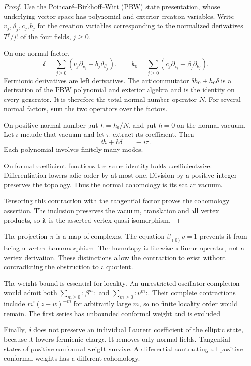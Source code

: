 \begin{proof}
Use the Poincar\'e--Birkhoff--Witt (PBW) state presentation, whose
underlying vector space has polynomial and exterior creation variables.
Write $v_j,\beta_j,c_j,b_j$ for the creation variables corresponding
to the normalized derivatives $T^j/j!$ of the four fields, $j\geq0$.

On one normal factor,
\[
 \delta=\sum_{j\geq0}
       (v_j\partial_{c_j}-b_j\partial_{\beta_j}),\qquad
 h_0=\sum_{j\geq0}
       (c_j\partial_{v_j}-\beta_j\partial_{b_j}).
\]
Fermionic derivatives are left derivatives. The anticommutator
$\delta h_0+h_0\delta$ is a derivation of the PBW polynomial and
exterior algebra and is the identity on every generator. It is
therefore the total normal-number operator $N$.
For several normal factors, sum the two operators over the factors.

On positive normal number put $h=h_0/N$, and put $h=0$ on the
normal vacuum. Let $i$ include that vacuum and let $\pi$ extract
its coefficient. Then
\begin{equation}\label{nd:eq:contraction}
 \delta h+h\delta=1-i\pi.
\end{equation}
Each polynomial involves finitely many modes.

On formal coefficient
functions the same identity holds coefficientwise. Differentiation
lowers adic order by at most one. Division by a positive integer
preserves the topology. Thus the normal cohomology is its scalar
vacuum.

Tensoring this contraction with the tangential factor proves
the cohomology assertion. The inclusion preserves the vacuum,
translation and all vertex products, so it is the asserted vertex
quasi-isomorphism.
\end{proof}

The projection $\pi$ is a map of complexes. The equation
$\beta_{(0)}v=1$ prevents it from being a vertex homomorphism.
The homotopy is likewise a linear operator, not a vertex derivation.
These distinctions allow the contraction to exist without contradicting
the obstruction to a quotient.

The weight bound is essential for locality. An unrestricted oscillator
completion would admit both $\sum_{m\geq0}:\beta^m:$ and
$\sum_{m\geq0}:v^m:$. Their complete contractions include
$m!(z-w)^{-m}$ for arbitrarily large $m$, so no finite locality order
would remain. The first series has unbounded conformal weight and is
excluded.

Finally, $\delta$ does not preserve an individual Laurent coefficient
of the elliptic state, because it lowers fermionic charge. It removes
only normal fields. Tangential states of positive conformal weight
survive. A differential contracting all positive conformal weights
has a different cohomology.

